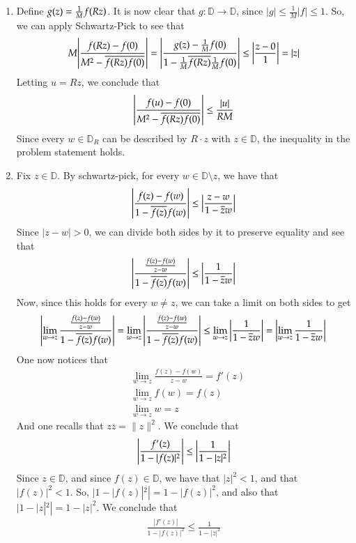 \documentclass[12pt]{article}
\theoremstyle{definitionstyle}
\newcommand{\mg}[1]{\| #1 \|}
\newcommand{\D}{\mathbb{D}}
\begin{document}
\begin{enumerate}[leftmargin=\labelsep]
		\item Define $g(z) = \frac 1M f\qty(Rz)$. It is now clear that $g: \D \to \D$, since $|g| \leq \frac1M|f| \leq 1$. So, we can apply Schwartz-Pick to see that 
		\begin{align*}
			M \qty|\frac{f(Rz) - f(0)}{M^2 - \overline{f(Rz)f(0)}}| = \qty|\frac{g(z)-\frac1M f(0)}{1-\frac1M \overline{f(Rz)} \frac 1M f(0)}| \leq \qty|\frac{z-0}{1}| = |z|
		\end{align*}
		Letting $u = Rz$, we conclude that 
		\begin{align*}
			\qty|\frac{f(u)-f(0)}{M^2-\overline{f(Rz)f(0)}}| \leq \frac{|u|}{RM}
		\end{align*}
		Since every $w \in \D_R$ can be described by $R \cdot z$ with $z \in \D$, the inequality in the problem statement holds.
		
		\item Fix $z \in \D$. By schwartz-pick, for every $w \in \D \setminus z$, we have that
		\begin{align*}
			\qty|\frac{f(z)-f(w)}{1-\overline{f(z)}f(w)}| \leq \qty|\frac{z-w}{1-\overline{z}w}|
		\end{align*}
		Since $|z-w| > 0$, we can divide both sides by it to preserve equality and see that
		\begin{align*}
			\qty|\frac{\frac{f(z)-f(w)}{z-w}}{1-\overline{f(z)}f(w)}| \leq \qty|\frac{1}{1-\overline{z}w}|
		\end{align*}
		Now, since this holds for every $w \neq z$, we can take a limit on both sides to get
		\begin{align*}
			\qty|\lim_{w \to z} \frac{\frac{f(z)-f(w)}{z-w}}{1-\overline{f(z)}f(w)}| = \lim_{w \to z}\qty|\frac{\frac{f(z)-f(w)}{z-w}}{1-\overline{f(z)}f(w)}| \leq \lim_{w \to z} \qty|\frac{1}{1-\overline{z}w}| = \qty|\lim_{w \to z} \frac{1}{1-\overline{z}w}|
		\end{align*}
		One now notices that 
		\begin{align*}
			&\lim_{w \to z} \frac{f(z)-f(w)}{z-w} = f'(z) \\
			&\lim_{w \to z} f(w) = f(z) \\
			&\lim_{w \to z} w = z
		\end{align*}
		And one recalls that $z \overline{z} = \mg{z}^2$. We conclude that
		\begin{align*}
			\qty|\frac{f'(z)}{1-|f(z)|^2}| \leq \qty|\frac{1}{1-|z|^2}|
		\end{align*}
		Since $z \in \D$, and since  $f(z) \in \D$, we have that $|z|^2 < 1$, and that $|f(z)|^2 < 1$. So, $|1-|f(z)|^2| = 1-|f(z)|^2$, and also that $|1-|z|^2| = 1-|z|^2$. We conclude that
		\begin{align*}
			\frac{|f'(z)|}{1-|f(z)|^2} \leq \frac{1}{1-|z|^2}
		\end{align*}
		

\end{enumerate}
\end{document}

